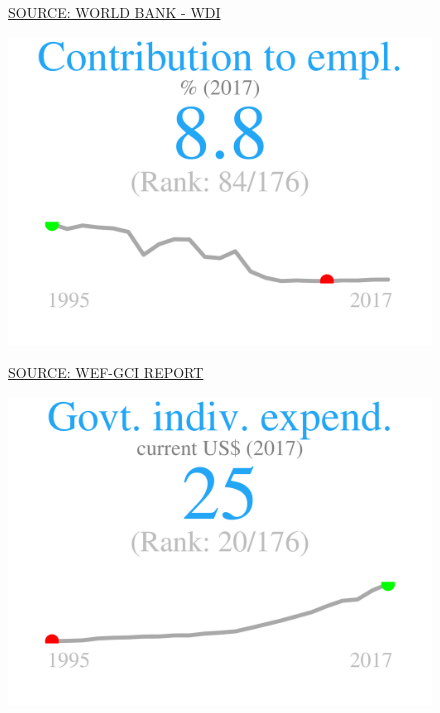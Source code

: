 \documentclass{article}\usepackage[]{graphicx}\usepackage[]{color}
\makeatletter
\def\maxwidth{ %
  \ifdim\Gin@nat@width>\linewidth
    \linewidth
  \else
    \Gin@nat@width
  \fi
}
\makeatother
\begin{document}
\begin{figure}
\begin{minipage}[t]{0.99\textwidth}
\begin{minipage}[t]{0.56\textwidth}
\begin{minipage}[c]{0.30\textwidth}
    \vspace{-2ex}
    \hspace{2ex}\tiny{\href{http://reports.weforum.org/global-competitiveness-index/}{\textcolor[HTML]{22A6F5}{SOURCE: WORLD BANK - WDI}}}
    \vspace{3ex}
    \end{minipage}
    
    \begin{minipage}[c]{0.30\textwidth}


{\centering \includegraphics[width=\maxwidth]{figure/figure_sparkline4-1} 

}



    \vspace{-2ex}
    \hspace{2ex}\tiny{\href{http://reports.weforum.org/global-competitiveness-index/}{\textcolor[HTML]{22A6F5}{SOURCE: WEF-GCI REPORT}}}
    \end{minipage}
    \begin{minipage}[c]{0.30\textwidth}


{\centering \includegraphics[width=\maxwidth]{figure/figure_sparkline5-1} 

}
\end{minipage}
\end{minipage}
\end{minipage}
\end{figure}
\end{document}
